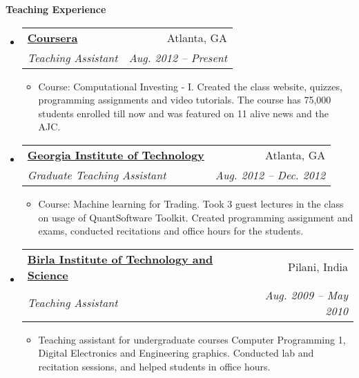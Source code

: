 \documentclass[letterpaper,9pt]{article}
\makeatletter
\newcommand{\resitem}[1]{\item #1 \vspace{-2pt}}
\newcommand{\resheading}[1]{{ \colorbox{mygrey}{\begin{minipage}{\textwidth}{\textbf{#1 \vphantom{p\^{E}}}}\end{minipage}}}}
\newcommand{\ressubheading}[4]{
\begin{tabular*}{6.5in}{l@{\extracolsep{\fill}}r}
        \textbf{#1} & #2 \\
        \textit{\small#3} & \textit{\small#4} \\
\end{tabular*}\vspace{-6pt}}
\makeatother
\begin{document}
\resheading{Teaching Experience}
	\vspace{-13pt}
	\begin{itemize}
		\item 
			\ressubheading{\href{https://www.coursera.org/course/compinvesting1}{Coursera}}{Atlanta, GA}{Teaching Assistant}{Aug. 2012 -- Present}
				{ \small
				\begin{itemize}
					\resitem{Course: Computational Investing - I. Created the class website, quizzes, programming assignments and video tutorials. The course has 75,000 students enrolled till now and was featured on 11 alive news and the AJC.}
				\end{itemize}
				}
		\item			
			\ressubheading{\href{https://www.gatech.edu}{Georgia Institute of Technology}}{Atlanta, GA}{Graduate Teaching Assistant}{Aug. 2012 -- Dec. 2012}
				{ \small				
				\begin{itemize}
					\resitem{Course: Machine learning for Trading. Took 3 guest lectures in the class on usage of QuantSoftware Toolkit. Created programming assignment and exams, conducted recitations and office hours for the students.}
				\end{itemize}
				}
		\item 
			\ressubheading{\href{http://www.bits-pilani.ac.in}{Birla Institute of Technology and Science}}{Pilani, India}{Teaching Assistant}{Aug. 2009 -- May 2010}
				{ \small
				\begin{itemize}
					\resitem{Teaching assistant for undergraduate courses Computer Programming 1, Digital Electronics and Engineering graphics. Conducted lab and recitation sessions, and helped students in office hours.
				\end{itemize}
				}

	}\end{itemize}  %
\end{document}
